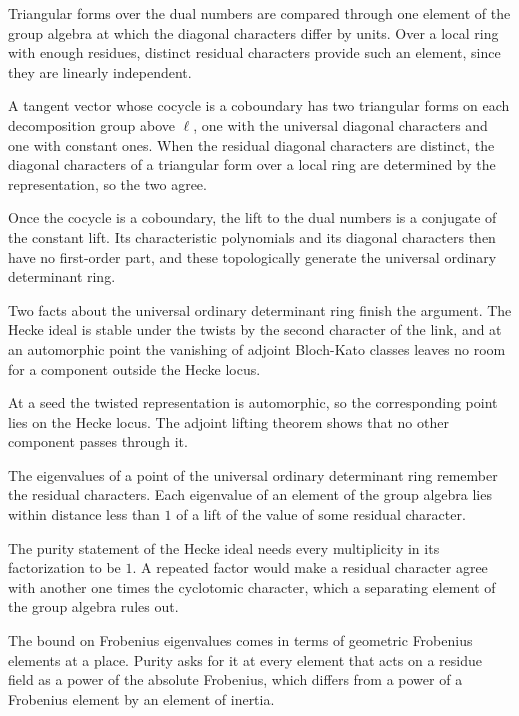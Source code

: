 Triangular forms over the dual numbers are compared through one element of the group algebra at which the diagonal characters differ by units. Over a local ring with enough residues, distinct residual characters provide such an element, since they are linearly independent.

A tangent vector whose cocycle is a coboundary has two triangular forms on each decomposition group above $\ell$, one with the universal diagonal characters and one with constant ones. When the residual diagonal characters are distinct, the diagonal characters of a triangular form over a local ring are determined by the representation, so the two agree.

Once the cocycle is a coboundary, the lift to the dual numbers is a conjugate of the constant lift. Its characteristic polynomials and its diagonal characters then have no first-order part, and these topologically generate the universal ordinary determinant ring.

Two facts about the universal ordinary determinant ring finish the argument. The Hecke ideal is stable under the twists by the second character of the link, and at an automorphic point the vanishing of adjoint Bloch-Kato classes leaves no room for a component outside the Hecke locus.

At a seed the twisted representation is automorphic, so the corresponding point lies on the Hecke locus. The adjoint lifting theorem shows that no other component passes through it.

The eigenvalues of a point of the universal ordinary determinant ring remember the residual characters. Each eigenvalue of an element of the group algebra lies within distance less than $1$ of a lift of the value of some residual character.

The purity statement of the Hecke ideal needs every multiplicity in its factorization to be $1$. A repeated factor would make a residual character agree with another one times the cyclotomic character, which a separating element of the group algebra rules out.

The bound on Frobenius eigenvalues comes in terms of geometric Frobenius elements at a place. Purity asks for it at every element that acts on a residue field as a power of the absolute Frobenius, which differs from a power of a Frobenius element by an element of inertia.


